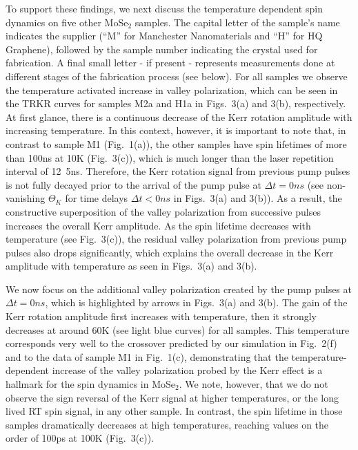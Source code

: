 \documentclass[prb,aps,superscriptaddress,reprint]{revtex4-1}
\begin{document}
To support these findings, we next discuss the temperature dependent spin dynamics on five other MoSe$_2$ samples. The capital letter of the sample’s name indicates the supplier (``M'' for Manchester Nanomaterials and ``H'' for HQ Graphene), followed by the sample number indicating the crystal used for fabrication. A final small letter - if present - represents measurements done at different stages of the fabrication process (see below). For all samples we observe the temperature activated increase in valley polarization, which can be seen in the TRKR curves for samples M2a and H1a in Figs.~3(a) and 3(b), respectively. At first glance, there is a continuous decrease of the Kerr rotation amplitude with increasing temperature. In this context, however, it is important to note that, in contrast to sample M1 (Fig.~1(a)), the other samples have spin lifetimes of more than \unit{100}{ns} at \unit{10}{K} (Fig.~3(c)), which is much longer than the laser repetition interval of \unit{12.5}{ns}. Therefore, the Kerr rotation signal from previous pump pulses is not fully decayed prior to the arrival of the pump pulse at $\Delta t=\unit{0}{ns}$ (see non-vanishing $\Theta_K$ for time delays $\Delta t < \unit{0}{ns}$ in Figs.~3(a) and 3(b)). As a result, the constructive superposition of the valley polarization from successive pulses increases the overall Kerr amplitude. As the spin lifetime decreases with temperature (see Fig.~3(c)), the residual valley polarization from previous pump pulses also drops significantly, which explains the overall decrease in the Kerr amplitude with temperature as seen in Figs.~3(a) and 3(b). 

We now focus on the additional valley polarization created by the pump pulses at $\Delta t = \unit{0}{ns}$, which is highlighted by arrows in Figs.~3(a) and 3(b). The gain of the Kerr rotation amplitude first increases with temperature, then it strongly decreases at around \unit{60}{K} (see light blue curves) for all samples. This temperature corresponds very well to the crossover predicted by our simulation in Fig.~2(f) and to the data of sample M1 in Fig.~1(c), demonstrating that the temperature-dependent increase of the valley polarization probed by the Kerr effect is a hallmark for the spin dynamics in MoSe$_2$. We note, however, that we do not observe the sign reversal of the Kerr signal at higher temperatures, or the long lived RT spin signal, in any other sample. In contrast, the spin lifetime in those samples dramatically decreases at high temperatures, reaching values on the order of \unit{100}{ps} at \unit{100}{K} (Fig.~3(c)).
\end{document}
